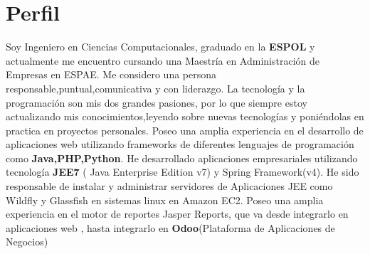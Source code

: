 \section{Perfil}
Soy Ingeniero en Ciencias Computacionales, graduado en la \textbf{ESPOL} y actualmente me encuentro cursando una Maestría en Administración de Empresas en ESPAE. Me considero una persona responsable,puntual,comunicativa y con liderazgo. La tecnología y la programación son mis dos grandes pasiones, por lo que siempre estoy actualizando mis conocimientos,leyendo sobre nuevas tecnologías y poniéndolas en practica en proyectos personales. Poseo una amplia experiencia en el  desarrollo de aplicaciones web utilizando  frameworks de diferentes lenguajes de programación como \textbf{Java,PHP,Python}.
He desarrollado aplicaciones empresariales utilizando tecnología \textbf{JEE7} ( Java Enterprise Edition v7) y Spring Framework(v4).
He sido responsable de instalar y administrar servidores de Aplicaciones JEE como Wildfly y Glassfish en sistemas linux en Amazon EC2.
Poseo una amplia experiencia en el motor de reportes Jasper Reports, que va desde integrarlo en aplicaciones web , hasta integrarlo en \textbf{Odoo}(Plataforma de Aplicaciones de Negocios)
